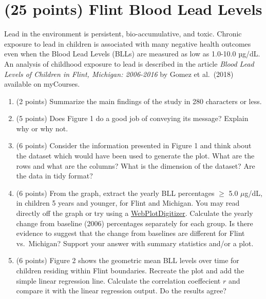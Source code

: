 \documentclass[letterpaper,12pt,twoside,]{pinp}
\begin{document}
\newpage

\hypertarget{points-flint-blood-lead-levels}{%
\section{(25 points) Flint Blood Lead
Levels}\label{points-flint-blood-lead-levels}}

Lead in the environment is persistent, bio-accumulative, and toxic.
Chronic exposure to lead in children is associated with many negative
health outcomes even when the Blood Lead Levels (BLLs) are measured as
low as 1.0-10.0 µg/dL. An analysis of childhood exposure to lead is
described in the article \emph{Blood Lead Levels of Children in Flint,
Michigan: 2006-2016} by Gomez et al.~(2018) available on myCourses.

\begin{enumerate}
\def\labelenumi{\alph{enumi})}
\item
  (2 points) Summarize the main findings of the study in 280 characters
  or less.
\item
  (5 points) Does Figure 1 do a good job of conveying its message?
  Explain why or why not.
\item
  (6 points) Consider the information presented in Figure 1 and think
  about the dataset which would have been used to generate the plot.
  What are the rows and what are the columns? What is the dimension of
  the dataset? Are the data in tidy format?
\item
  (6 points) From the graph, extract the yearly BLL percentages \(\geq\)
  5.0 \(\mu\)g/dL, in children 5 years and younger, for Flint and
  Michigan. You may read directly off the graph or try using a
  \href{https://automeris.io/WebPlotDigitizer/}{WebPlotDigitizer}.
  Calculate the yearly change from baseline (2006) percentages
  separately for each group. Is there evidence to suggest that the
  change from baselines are different for Flint vs.~Michigan? Support
  your answer with summary statistics and/or a plot.
\item
  (6 points) Figure 2 shows the geometric mean BLL levels over time for
  children residing within Flint boundaries. Recreate the plot and add
  the simple linear regression line. Calculate the correlation
  coeffecient \(r\) and compare it with the linear regression output. Do
  the results agree?
\end{enumerate}





\end{document}
